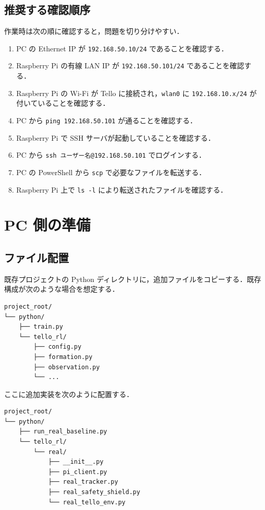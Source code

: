 \subsection{推奨する確認順序}

作業時は次の順に確認すると，問題を切り分けやすい．

\begin{enumerate}[label=\arabic*.]
  \item PC の Ethernet IP が \texttt{192.168.50.10/24} であることを確認する．
  \item Raspberry Pi の有線 LAN IP が \texttt{192.168.50.101/24} であることを確認する．
  \item Raspberry Pi の Wi-Fi が Tello に接続され，\texttt{wlan0} に \texttt{192.168.10.x/24} が付いていることを確認する．
  \item PC から \texttt{ping 192.168.50.101} が通ることを確認する．
  \item Raspberry Pi で SSH サーバが起動していることを確認する．
  \item PC から \texttt{ssh ユーザー名@192.168.50.101} でログインする．
  \item PC の PowerShell から \texttt{scp} で必要なファイルを転送する．
  \item Raspberry Pi 上で \texttt{ls -l} により転送されたファイルを確認する．
\end{enumerate}

\section{PC 側の準備}
\label{sec:pc_setup}

\subsection{ファイル配置}

既存プロジェクトの Python ディレクトリに，追加ファイルをコピーする．既存構成が次のような場合を想定する．

\begin{lstlisting}
project_root/
└── python/
    ├── train.py
    └── tello_rl/
        ├── config.py
        ├── formation.py
        ├── observation.py
        └── ...
\end{lstlisting}

ここに追加実装を次のように配置する．

\begin{lstlisting}
project_root/
└── python/
    ├── run_real_baseline.py
    └── tello_rl/
        └── real/
            ├── __init__.py
            ├── pi_client.py
            ├── real_tracker.py
            ├── real_safety_shield.py
            └── real_tello_env.py
\end{lstlisting}

